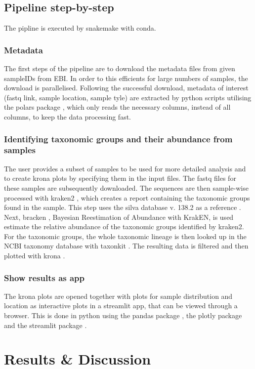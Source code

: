 \documentclass{article}
\begin{document}
\subsection{Pipeline step-by-step}
The pipline is executed by snakemake \parencite{snakemake} with conda.

\subsubsection{Metadata}
The first steps of the pipeline are to download the metadata files from given sampleIDs from EBI. In order to this efficients for large numbers of samples, the download is parallelised. Following the successful download, metadata of interest (fastq link, sample location, sample tyle) are extracted by python scripts utilising the polars package \parencite{polars}, which only reads the necessary columns, instead of all columns, to keep the data processing fast.

\subsubsection{Identifying taxonomic groups and their abundance from samples}
The user provides a subset of samples to be used for more detailed analysis and to create krona plots by specifying them in the input files. The fastq files for these samples are subsequently downloaded. The sequences are then sample-wise processed with kraken2 \parencite{Kraken, Kraken2}, which creates a report containing the taxonomic groups found in the sample. This step uses the silva database v. 138.2 as a reference \parencite{silva}. Next, bracken \parencite{bracken}, Bayesian Reestimation of Abundance with KrakEN, is used estimate the relative abundance of the taxonomic groups identified by kraken2. For the taxonomic groups, the whole taxonomic lineage is then looked up in the NCBI taxonomy database \parencite{ncbi} with taxonkit \parencite{taxonkit}. The resulting data is filtered  and then plotted with krona \parencite{krona}.

\subsubsection{Show results as app}
The krona plots are opened together with plots for sample distribution and location as interactive plots in a streamlit app, that can be viewed through a browser. This is done in python using the pandas package \parencite{pandas}, the plotly package \parencite{plotly} and the streamlit package \parencite{streamlit}.



\section{Results \& Discussion}
\label{discussion}


\newpage
\printbibliography
\end{document}
